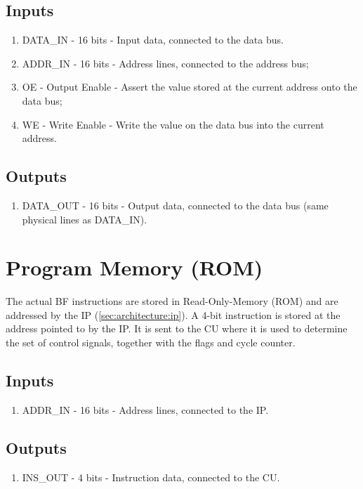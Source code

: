 \subsection*{Inputs}
\begin{enumerate}
\itemsep0em 
\item DATA\_IN - 16 bits - Input data, connected to the data bus.
\item ADDR\_IN - 16 bits - Address lines, connected to the address bus;
\item OE - Output Enable - Assert the value stored at the current address onto the data bus;
\item WE - Write Enable - Write the value on the data bus into the current address.
\end{enumerate}

\subsection*{Outputs}
\begin{enumerate}
\itemsep0em 
\item DATA\_OUT - 16 bits - Output data, connected to the data bus (same physical lines as DATA\_IN).
\end{enumerate}

\section{Program Memory (ROM)} \label{sec:architecture:rom}
The actual BF instructions are stored in Read-Only-Memory (ROM) and are addressed by the IP (\ref{sec:architecture:ip}). A 4-bit instruction is stored at the address pointed to by the IP. It is sent to the CU where it is used to determine the set of control signals, together with the flags and cycle counter.

\subsection*{Inputs}
\begin{enumerate}
\itemsep0em 
\item ADDR\_IN - 16 bits - Address lines, connected to the IP.
\end{enumerate}

\subsection*{Outputs}
\begin{enumerate}
\itemsep0em 
\item INS\_OUT - 4 bits - Instruction data, connected to the CU.
\end{enumerate}


